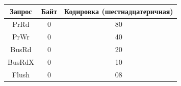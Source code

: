       \begin{table}[b]\small %


      \vspace*{-12pt}


      \begin{center}




      \vspace*{2ex}


      


\tabcolsep=10pt


      \begin{tabular}{|c|c|c|}


      \hline


Запрос &Байт&Кодировка (шестнадцатеричная)\\


\hline


PrRd&0&80\\


PrWr&0&40\\


BusRd&0&20\\


BusRdX&0&10\\


Flush&0&08\\


\hline


\end{tabular}


\end{center}






      \begin{center}




      \vspace*{2ex}


      


      \begin{tabular}{|c|c|c|}


      \hline



\end{tabular}
\end{center}
\end{table}
